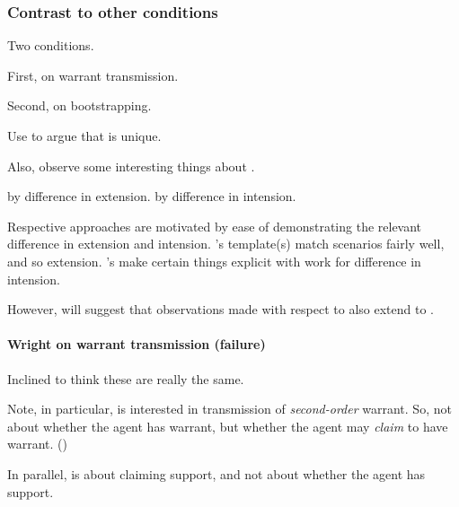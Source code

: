 \subsubsection{Contrast to other conditions}
\label{sec:contr-other-cond}

\begin{note}
  Two conditions.

  First, \citeauthor{Wright:2011wn} on warrant transmission.

  Second, \citeauthor{Weisberg:2010to} on bootstrapping.
\end{note}

\begin{note}
  Use to argue that \nI{} is unique.

  Also, observe some interesting things about \nI{}.

  \citeauthor{Wright:2011wn} by difference in extension.
  \citeauthor{Weisberg:2010to} by difference in intension.

  Respective approaches are motivated by ease of demonstrating the relevant difference in extension and intension.
  \citeauthor{Wright:2011wn}'s template(s) match scenarios fairly well, and so extension.
  \citeauthor{Weisberg:2010to}'s make certain things explicit with work for difference in intension.

  However, will suggest that observations made with respect to \citeauthor{Weisberg:2010to} also extend to \citeauthor{Wright:2011wn}.
\end{note}

\paragraph{Wright on warrant transmission (failure)}

\begin{note}
  Inclined to think these are really the same.

  Note, in particular, \citeauthor{Wright:2000tq} is interested in transmission of \emph{second-order} warrant.
  So, not about whether the agent has warrant, but whether the agent may \emph{claim} to have warrant.
  (\Citeyear[89]{Wright:2011wn})

  In parallel, \nI{} is about claiming support, and not about whether the agent has support.
\end{note}

